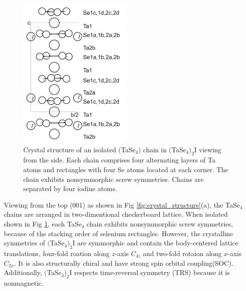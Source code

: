 \begin{figure}[h]
    \centering
    \includegraphics[width =0.5\textwidth]{images/signlechain.png}
    \caption{Crystal structure of an isolated $($TaSe$_4)$ chain in $($TaSe$_4)_2$I viewing from the side. Each chain comprises four alternating layers of Ta atoms and rectangles with four Se atoms located at each corner. The chain exhibits nonsymmorphic screw symmetries.  Chains are separated by four iodine atoms.\cite{van2001structure}}
    \label{fig:single_chain}
\end{figure}

Viewing from the top (001) as shown in Fig \ref{fig:crystal_structure}(a), the TaSe$_4$ chains are arranged in two-dimentional checkerboard lattice. When isolated shown in Fig \ref{fig:single_chain}, each TaSe$_4$ chain exhibits nonsymmorphic screw symmetries, because of the stacking order of selenium rectangles. However, the crystalline symmetries of $($TaSe$_4)_2$I are symmorphic and contain the body-centered lattice translations, four-fold roation along $z$-axis $C_{4z}$ and two-fold rotaion along $x$-axis $C_{2x}$. It is also structurally chiral and have strong spin orbital coupling(SOC).
Additionally, $($TaSe$_4)_2$I respects time-reversal symmetry (TRS) because it is nonmagnetic.



